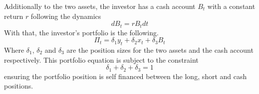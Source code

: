 Additionally to the two assets, the investor has a cash account $B_t$ with a constant return $r$ following the dynamics
\begin{equation}
    dB_t=rB_tdt
\end{equation}
With that, the investor's portfolio is the following.
\begin{equation}
    \label{e:portfolio-equation}
    \Pi_t=\delta_1 y_t + \delta_2 x_t + \delta_3 B_t
\end{equation}
Where $\delta_1$, $\delta_2$ and $\delta_3$ are the position sizes for the two assets and the cash account respectively. This portfolio equation is subject to the constraint 
\begin{equation}
    \delta_1 + \delta_2 + \delta_3 = 1
\end{equation}
ensuring the portfolio position is self financed between the long, short and cash positions. 

